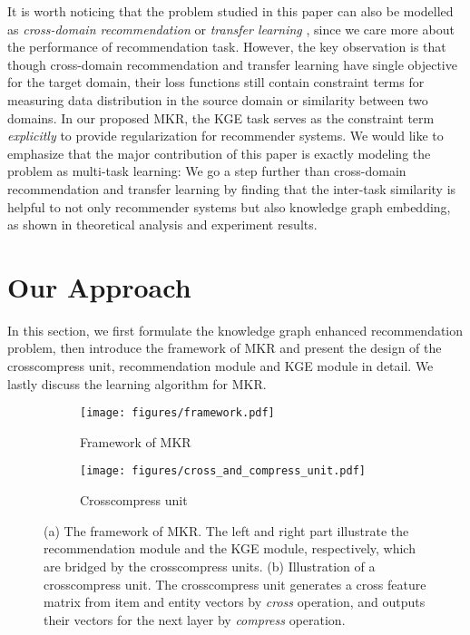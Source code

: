 \documentclass[sigconf]{acmart}
\begin{document}
	It is worth noticing that the problem studied in this paper can also be modelled as \textit{cross-domain recommendation} \cite{tang2012cross} or \textit{transfer learning} \cite{pan2010survey}, since we care more about the performance of recommendation task.
	However, the key observation is that though cross-domain recommendation and transfer learning have single objective for the target domain, their loss functions still contain constraint terms for measuring data distribution in the source domain or similarity between two domains.
	In our proposed MKR, the KGE task serves as the constraint term \textit{explicitly} to provide regularization for recommender systems.
	We would like to emphasize that the major contribution of this paper is exactly modeling the problem as multi-task learning: We go a step further than cross-domain recommendation and transfer learning by finding that the inter-task similarity is helpful to not only recommender systems but also knowledge graph embedding, as shown in theoretical analysis and experiment results.
	
	

\section{Our Approach}
	In this section, we first formulate the knowledge graph enhanced recommendation problem, then introduce the framework of MKR and present the design of the crosscompress unit, recommendation module and KGE module in detail.
	We lastly discuss the learning algorithm for MKR.
	
	\begin{figure*}[t]
		\centering
        \begin{subfigure}[b]{0.5\textwidth}
            \texttt{[image: figures/framework.pdf]}
            \caption{Framework of MKR}
            \label{fig:framework}
        \end{subfigure}
        \hspace{0.06\textwidth}
        \begin{subfigure}[b]{0.36\textwidth}
            \texttt{[image: figures/cross\_and\_compress\_unit.pdf]}
            \caption{Crosscompress unit}
            \label{fig:cross_feature_sharing_unit}
        \end{subfigure}
        \caption{(a) The framework of MKR. The left and right part illustrate the recommendation module and the KGE module, respectively, which are bridged by the crosscompress units. (b) Illustration of a crosscompress unit. The crosscompress unit generates a cross feature matrix from item and entity vectors by \textit{cross} operation, and outputs their vectors for the next layer by \textit{compress} operation.}
        \label{fig:1}
    \end{figure*}
    
\end{document}
